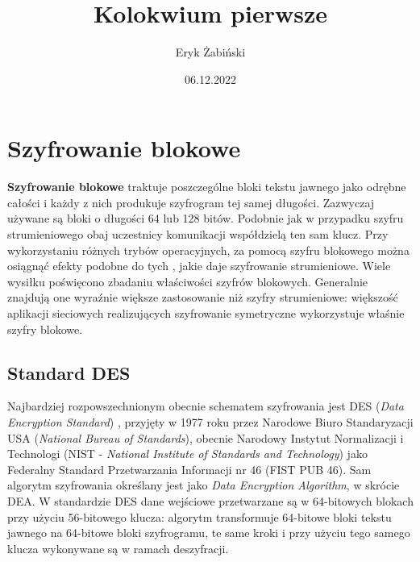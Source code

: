 \documentclass[12pt, a4paper,titlepage]{article}
\title{Kolokwium pierwsze}
\author{Eryk Żabiński}
\date{06.12.2022}
\begin{document}
\centering\maketitle
\newpage
\raggedright\section{Szyfrowanie blokowe}
\justify \textbf{Szyfrowanie blokowe} \cite{latexdps} traktuje poszczególne bloki tekstu jawnego jako odrębne całości i każdy z nich produkuje szyfrogram tej samej długości. Zazwyczaj używane są bloki o długości 64 lub 128 bitów. Podobnie jak w przypadku szyfru strumieniowego obaj uczestnicy komunikacji współdzielą ten sam klucz. Przy wykorzystaniu różnych trybów operacyjnych, za pomocą szyfru blokowego można osiągnąć efekty podobne do tych , jakie daje szyfrowanie strumieniowe.
\newline
Wiele wysiłku poświęcono zbadaniu właściwości szyfrów blokowych. Generalnie znajdują one wyraźnie większe zastosowanie niż szyfry strumieniowe: większość aplikacji sieciowych realizujących szyfrowanie symetryczne wykorzystuje właśnie szyfry blokowe.

\subsection{Standard DES}
Najbardziej rozpowszechnionym obecnie schematem szyfrowania jest DES (\textit{Data Encryption Standard}) \cite{latexdps2}, przyjęty w 1977 roku przez Narodowe Biuro Standaryzacji USA (\textit{National Bureau of Standards}), obecnie Narodowy Instytut Normalizacji i Technologi (NIST - \textit{National Institute of Standards and Technology}) jako Federalny Standard Przetwarzania Informacji nr 46 (FIST PUB 46). Sam algorytm szyfrowania określany jest jako \textit{Data Encryption Algorithm}, w skrócie DEA. W standardzie DES dane wejściowe przetwarzane są w 64-bitowych blokach przy użyciu 56-bitowego klucza: algorytm transformuje 64-bitowe bloki tekstu jawnego na 64-bitowe bloki szyfrogramu, te same kroki i przy użyciu tego samego klucza wykonywane są w ramach deszyfracji.
\end{document}
